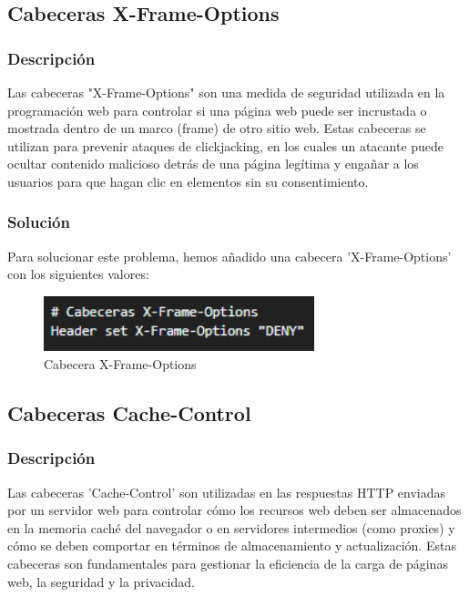 \documentclass{report}
\begin{document}
            \subsection{Cabeceras X-Frame-Options}
                \subsubsection{Descripción}
                    Las cabeceras "X-Frame-Options" son una medida de seguridad utilizada en la programación web para controlar si una página web puede ser incrustada o mostrada dentro de un marco (frame) de otro sitio web. Estas cabeceras se utilizan para prevenir ataques de clickjacking, en los cuales un atacante puede ocultar contenido malicioso detrás de una página legítima y engañar a los usuarios para que hagan clic en elementos sin su consentimiento.
                \subsubsection{Solución}
                    Para solucionar este problema, hemos añadido una cabecera 'X-Frame-Options' con los siguientes valores:
                    \begin{figure}[H]
                        \centering
                        \includegraphics[width=0.7\textwidth]{./img/vulnerabilidades/3.5.8.1.png}
                        \caption{Cabecera X-Frame-Options}
                    \end{figure}
            \subsection{Cabeceras Cache-Control}
                \subsubsection{Descripción}
                    Las cabeceras 'Cache-Control' son utilizadas en las respuestas HTTP enviadas por un servidor web para controlar cómo los recursos web deben ser almacenados en la memoria caché del navegador o en servidores intermedios (como proxies) y cómo se deben comportar en términos de almacenamiento y actualización. Estas cabeceras son fundamentales para gestionar la eficiencia de la carga de páginas web, la seguridad y la privacidad.
\end{document}

